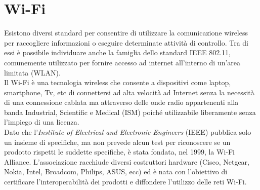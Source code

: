\section{Wi-Fi}
Esistono diversi standard per consentire di utilizzare la comunicazione wireless per raccogliere informazioni o eseguire determinate attività di controllo. Tra di essi è possibile individuare anche la famiglia dello standard IEEE 802.11, comunemente utilizzato per fornire accesso ad internet all'interno di un'area limitata (WLAN).\\
Il Wi-Fi è una tecnologia wireless che consente a dispositivi come laptop, smartphone, Tv, etc di connettersi ad alta velocità ad Internet senza la necessità di una connessione cablata ma attraverso delle onde radio appartenenti alla banda Industrial, Scientific e Medical (ISM) poiché utilizzabile liberamente senza l'impiego di una licenza.\\
Dato che l'\textit{Institute of Electrical and Electronic Engineers} (IEEE) pubblica solo un insieme di specifiche, ma non prevede alcun test per riconoscere se un prodotto rispetti le suddette specifiche, è stata fondata, nel 1999, la Wi-Fi Alliance. L'associazione racchiude diversi costruttori hardware (Cisco, Netgear, Nokia, Intel, Broadcom, Philips, ASUS, ecc) ed è nata con l'obiettivo di certificare l'interoperabilità dei prodotti e diffondere l'utilizzo delle reti Wi-Fi.\\

